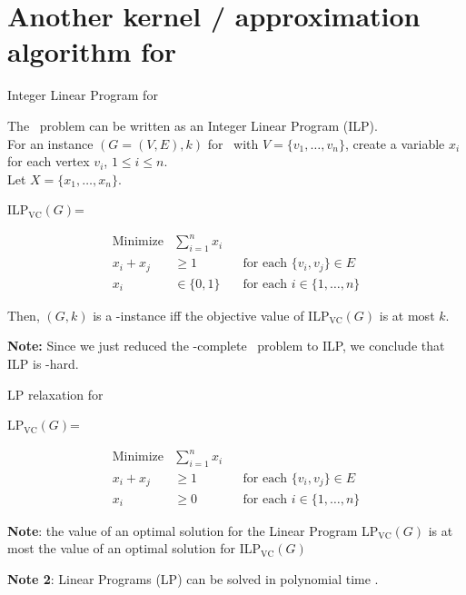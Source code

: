 \section{Another kernel / approximation algorithm for \VC}


\begin{frame}{Integer Linear Program for \VC}

 The \VC\ problem can be written as an Integer Linear Program (ILP).\\
 For an instance $(G=(V,E),k)$ for \VC\ with $V = \{v_1,\dots,v_n\}$,
 create a variable $x_i$ for each vertex $v_i$, $1\le i\le n$.\\
 Let $X = \{x_1,\dots,x_n\}$.
 
 \begin{center}
  ILP$_{\text{VC}}(G)$=
  \begin{boxedminipage}{0.79 \textwidth}
   \begin{align*}
     \text{Minimize} &\sum_{i=1}^n x_i\\
     x_i + x_j &\ge 1 && \text{for each } \{v_i,v_j\}\in E\\
     x_i &\in \{0,1\} && \text{for each } i \in \{1,\dots,n\}
   \end{align*}
  \end{boxedminipage}
 \end{center}
 
 Then, $(G,k)$ is a \Yes-instance iff the objective value of ILP$_{\text{VC}}(G)$ is at most $k$.
 
 \medskip
 \noindent \textbf{Note:} Since we just reduced the \NP-complete \VC\ problem to ILP, we conclude that ILP is \NP-hard.

\end{frame}


\begin{frame}{LP relaxation for \VC}

 \begin{center}
  LP$_{\text{VC}}(G)$=
  \begin{boxedminipage}{0.79 \textwidth}
   \begin{align*}
     \text{Minimize} &\sum_{i=1}^n x_i\\
     x_i + x_j &\ge 1 && \text{for each } \{v_i,v_j\}\in E\\
     x_i &\ge 0 && \text{for each } i \in \{1,\dots,n\}
   \end{align*}
  \end{boxedminipage}
 \end{center}
 
 \noindent
 \textbf{Note}: the value of an optimal solution for the Linear Program LP$_{\text{VC}}(G)$ is at most the value of an optimal solution for ILP$_{\text{VC}}(G)$

 \medskip
 \noindent
\textbf{Note 2}: Linear Programs (LP) can be solved in polynomial time \cite{CohenLS19}.

\end{frame}


